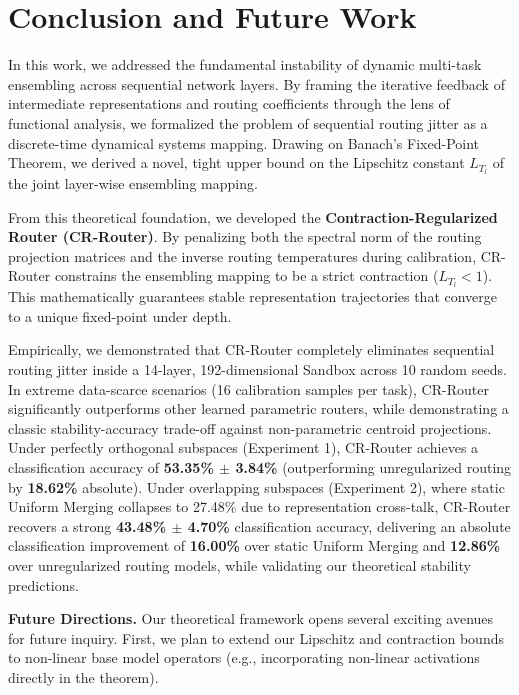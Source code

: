 \section{Conclusion and Future Work}
\label{sec:conclusion}

In this work, we addressed the fundamental instability of dynamic multi-task ensembling across sequential network layers. By framing the iterative feedback of intermediate representations and routing coefficients through the lens of functional analysis, we formalized the problem of sequential routing jitter as a discrete-time dynamical systems mapping. Drawing on Banach's Fixed-Point Theorem, we derived a novel, tight upper bound on the Lipschitz constant $L_{T_l}$ of the joint layer-wise ensembling mapping. 

From this theoretical foundation, we developed the \textbf{Contraction-Regularized Router (CR-Router)}. By penalizing both the spectral norm of the routing projection matrices and the inverse routing temperatures during calibration, CR-Router constrains the ensembling mapping to be a strict contraction ($L_{T_l} < 1$). This mathematically guarantees stable representation trajectories that converge to a unique fixed-point under depth.

Empirically, we demonstrated that CR-Router completely eliminates sequential routing jitter inside a 14-layer, 192-dimensional Sandbox across 10 random seeds. In extreme data-scarce scenarios (16 calibration samples per task), CR-Router significantly outperforms other learned parametric routers, while demonstrating a classic stability-accuracy trade-off against non-parametric centroid projections. Under perfectly orthogonal subspaces (Experiment 1), CR-Router achieves a classification accuracy of \textbf{53.35\% $\pm$ 3.84\%} (outperforming unregularized routing by \textbf{18.62\%} absolute). Under overlapping subspaces (Experiment 2), where static Uniform Merging collapses to 27.48\% due to representation cross-talk, CR-Router recovers a strong \textbf{43.48\% $\pm$ 4.70\%} classification accuracy, delivering an absolute classification improvement of \textbf{16.00\%} over static Uniform Merging and \textbf{12.86\%} over unregularized routing models, while validating our theoretical stability predictions.

\textbf{Future Directions.} 
Our theoretical framework opens several exciting avenues for future inquiry. First, we plan to extend our Lipschitz and contraction bounds to non-linear base model operators (e.g., incorporating non-linear activations directly in the theorem). 

